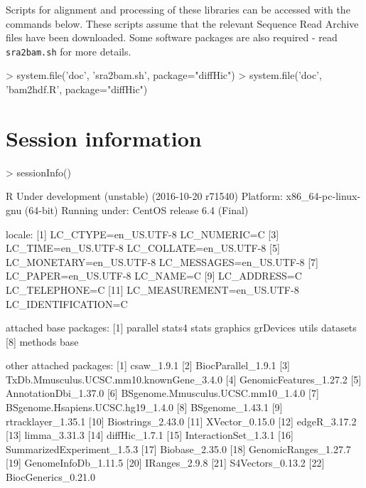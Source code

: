\documentclass[12pt]{report}
\renewenvironment{Schunk}{\vspace{0pt}}{\vspace{0pt}}
\newcommand{\code}[1]{{\small\texttt{#1}}}
\begin{document}
Scripts for alignment and processing of these libraries can be accessed with the commands below.
These scripts assume that the relevant Sequence Read Archive files have been downloaded.
Some software packages are also required - read \code{sra2bam.sh} for more details.

\begin{Schunk}
\begin{Sinput}
> system.file('doc', 'sra2bam.sh', package="diffHic")
> system.file('doc', 'bam2hdf.R', package="diffHic")
\end{Sinput}
\end{Schunk}

\section{Session information}
\begin{Schunk}
\begin{Sinput}
> sessionInfo()
\end{Sinput}
\begin{Soutput}
R Under development (unstable) (2016-10-20 r71540)
Platform: x86_64-pc-linux-gnu (64-bit)
Running under: CentOS release 6.4 (Final)

locale:
 [1] LC_CTYPE=en_US.UTF-8       LC_NUMERIC=C              
 [3] LC_TIME=en_US.UTF-8        LC_COLLATE=en_US.UTF-8    
 [5] LC_MONETARY=en_US.UTF-8    LC_MESSAGES=en_US.UTF-8   
 [7] LC_PAPER=en_US.UTF-8       LC_NAME=C                 
 [9] LC_ADDRESS=C               LC_TELEPHONE=C            
[11] LC_MEASUREMENT=en_US.UTF-8 LC_IDENTIFICATION=C       

attached base packages:
[1] parallel  stats4    stats     graphics  grDevices utils     datasets 
[8] methods   base     

other attached packages:
 [1] csaw_1.9.1                              
 [2] BiocParallel_1.9.1                      
 [3] TxDb.Mmusculus.UCSC.mm10.knownGene_3.4.0
 [4] GenomicFeatures_1.27.2                  
 [5] AnnotationDbi_1.37.0                    
 [6] BSgenome.Mmusculus.UCSC.mm10_1.4.0      
 [7] BSgenome.Hsapiens.UCSC.hg19_1.4.0       
 [8] BSgenome_1.43.1                         
 [9] rtracklayer_1.35.1                      
[10] Biostrings_2.43.0                       
[11] XVector_0.15.0                          
[12] edgeR_3.17.2                            
[13] limma_3.31.3                            
[14] diffHic_1.7.1                           
[15] InteractionSet_1.3.1                    
[16] SummarizedExperiment_1.5.3              
[17] Biobase_2.35.0                          
[18] GenomicRanges_1.27.7                    
[19] GenomeInfoDb_1.11.5                     
[20] IRanges_2.9.8                           
[21] S4Vectors_0.13.2                        
[22] BiocGenerics_0.21.0                     


\end{Soutput}
\end{Schunk}
\end{document}
